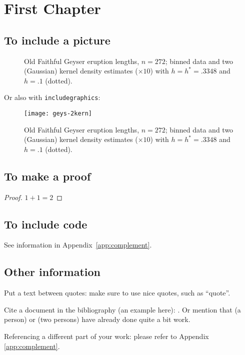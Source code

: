 \chapter{First Chapter} 

\section{To include a picture}
\begin{figure}[hbt!]%
  \caption[Geyser data: binned histogram, Silverman's and another
  kernel]%
  {Old Faithful Geyser eruption lengths, $n=272$; binned data and two
    (Gaussian) kernel density estimates ($\times 10$) with $h=h^*= .3348$
    and $h= .1$ (dotted).}%
  \label{fig:geys1}
\end{figure}

Or also with \texttt{includegraphics}:
\begin{figure}[hbt!]%
  \centering
  \texttt{[image: geys-2kern]} %
  \caption[Geyser data: binned histogram, Silverman's and another
  kernel]%
  {Old Faithful Geyser eruption lengths, $n=272$; binned data and two
    (Gaussian) kernel density estimates ($\times 10$) with $h=h^*= .3348$
    and $h= .1$ (dotted).}%
  \label{fig:geys2}
\end{figure}

\section{To make a proof}
\begin{proof}
  $1 + 1 = 2$
\end{proof}

\section{To include \Rp code}
See information in Appendix~\ref{app:complement}.


\section{Other information}
Put a text between quotes: make sure to use nice quotes, such as ``quote''.

Cite a document in the bibliography (an example here): \cite{Reference}.
Or mention that \citeauthor{HamF85} (a person) or \citeauthor{StaWW91} (two
persons) have already done quite a bit work.

Referencing a different part of your work: please refer to Appendix \ref{app:complement}.


